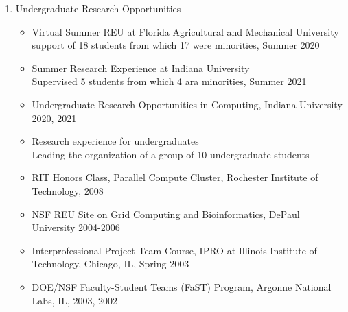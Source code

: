 \documentclass{article}
\begin{document}
\begin{enumerate}

\item Undergraduate Research Opportunities
  
  \begin{itemize}
  \item  Virtual Summer REU at Florida Agricultural and Mechanical University~\\
  support of 18 students from which 17 were minorities, Summer 2020
\item  Summer Research Experience at Indiana University ~\\
  Supervised 5 students from which 4 ara minorities,  Summer 2021
\item  Undergraduate Research Opportunities in Computing,
  Indiana University 2020, 2021
\item Research experience for undergraduates~\\
  Leading the organization of a group of 10 undergraduate students



    \item RIT Honors Class, Parallel Compute Cluster, Rochester Institute of Technology, 2008
    \item NSF REU Site on Grid Computing and Bioinformatics, DePaul University 2004-2006 
    \item Interprofessional Project Team Course, IPRO at Illinois Institute of Technology, Chicago, IL, Spring 2003
    \item DOE/NSF Faculty-Student Teams (FaST) Program, Argonne National Labs, IL, 2003, 2002 

  \end{itemize}
  

\end{enumerate}
\end{document}
